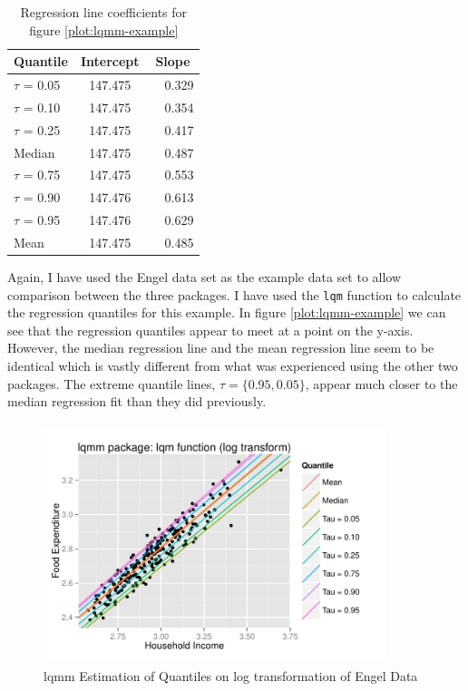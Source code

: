 \documentclass[12pt,a4paper]{report}
\begin{document}
\begin{table}[ht]
\begin{center}
\begin{tabular}{|l||c|c|} \hline
\multicolumn{1}{|l||}{Quantile}&\multicolumn{1}{c|}{Intercept}&\multicolumn{1}{c|}{Slope}\tabularnewline
\hline
$\tau$ = 0.05&147.475&~~0.329\tabularnewline
$\tau$ = 0.10&147.475&~~0.354\tabularnewline
$\tau$ = 0.25&147.475&~~0.417\tabularnewline
Median&147.475&~~0.487\tabularnewline
$\tau$ = 0.75&147.475&~~0.553\tabularnewline
$\tau$ = 0.90&147.476&~~0.613\tabularnewline
$\tau$ = 0.95&147.476&~~0.629\tabularnewline
Mean&147.475&~~0.485\tabularnewline
\hline
\end{tabular}
\end{center}
\caption{Regression line coefficients for figure \ref{plot:lqmm-example}}
\label{table:lqmm-example}
\end{table}

Again, I have used the Engel data set as the example data set to allow comparison between the three packages. I have used the {\small\verb"lqm"} function to calculate the regression quantiles for this example. In figure \ref{plot:lqmm-example} we can see that the regression quantiles appear to meet at a point on the y-axis. However, the median regression line and the mean regression line seem to be identical which is vastly different from what was experienced using the other two packages. The extreme quantile lines, $\tau=\{0.95,0.05\}$, appear much closer to the median regression fit than they did previously.
\vspace{2mm}

\begin{figure}[ht]\centering
    \includegraphics[width=10cm, height=7cm]{PlotofLqmmLog.pdf}
    \caption{lqmm Estimation of Quantiles on log transformation of Engel Data}
    \label{plot:lqmmlog-example}
\end{figure}
\end{document}
